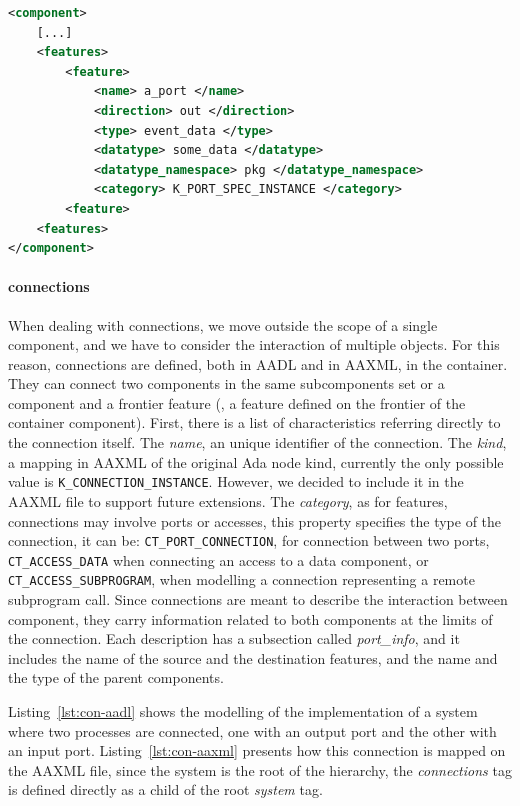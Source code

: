 \begin{lstlisting}[language=XML,caption={AAXML description of AADL features},label=lst:feature-aaxml]
<component>
	[...]
	<features>
		<feature>
			<name> a_port </name>
			<direction> out </direction>
			<type> event_data </type>
			<datatype> some_data </datatype>
			<datatype_namespace> pkg </datatype_namespace>
			<category> K_PORT_SPEC_INSTANCE </category>
		<feature>
	<features>
</component>
\end{lstlisting}

\paragraph{connections} When dealing with connections, we move outside the scope of a single component, and we have to consider the interaction of multiple objects. For this reason, connections are defined, both in AADL and in AAXML, in the container. They can connect two components in the same subcomponents set or a component and a frontier feature (\ie, a feature defined on the frontier of the container component). First, there is a list of characteristics referring directly to the connection itself. The \textit{name}, an unique identifier of the connection. The \textit{kind}, a mapping in AAXML of the original Ada node kind, currently the only possible value is \texttt{K\_CONNECTION\_INSTANCE}. However, we decided to include it in the AAXML file to support future extensions. The \textit{category}, as for features, connections may involve ports or accesses, this property specifies the type of the connection, it can be: \texttt{CT\_PORT\_CONNECTION}, for connection between two ports, \texttt{CT\_ACCESS\_DATA} when connecting an access to a data component, or \texttt{CT\_ACCESS\_SUBPROGRAM}, when modelling a connection representing a remote subprogram call. Since connections are meant to describe the interaction between component, they carry information related to both components at the limits of the connection. Each description has a subsection called \textit{port\_info}, and it includes the name of the source and the destination features, and the name and the type of the parent components.

Listing~\ref{lst:con-aadl} shows the modelling of the implementation of a system where two processes are connected, one with an output port and the other with an input port. Listing~\ref{lst:con-aaxml} presents how this connection is mapped on the AAXML file, since the system is the root of the hierarchy, the \textit{connections} tag is defined directly as a child of the root \textit{system} tag.

